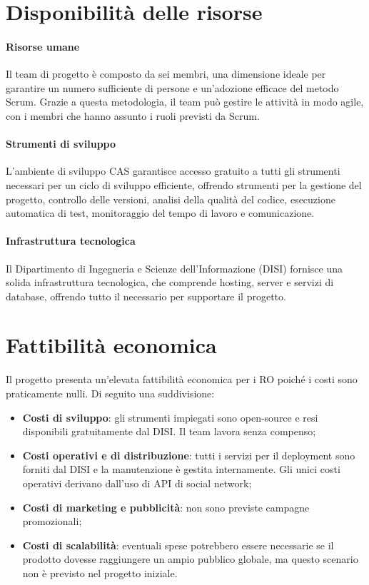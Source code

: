 \documentclass[12pt,a4paper]{report}
\begin{document}
\section{Disponibilità delle risorse}

\paragraph{Risorse umane}
Il team di progetto è composto da sei membri, una dimensione ideale per garantire un numero sufficiente di persone e un'adozione efficace del metodo Scrum. Grazie a questa metodologia, il team può gestire le attività in modo agile, con i membri che hanno assunto i ruoli previsti da Scrum.

\paragraph{Strumenti di sviluppo}
L'ambiente di sviluppo CAS garantisce accesso gratuito a tutti gli strumenti necessari per un ciclo di sviluppo efficiente, offrendo strumenti per la gestione del progetto, controllo delle versioni, analisi della qualità del codice, esecuzione automatica di test, monitoraggio del tempo di lavoro e comunicazione.

\paragraph{Infrastruttura tecnologica}
Il Dipartimento di Ingegneria e Scienze dell'Informazione (DISI) fornisce una solida infrastruttura tecnologica, che comprende hosting, server e servizi di database, offrendo tutto il necessario per supportare il progetto.

\section{Fattibilità economica}
Il progetto presenta un'elevata fattibilità economica per i RO poiché i costi sono praticamente nulli. Di seguito una suddivisione:
\begin{itemize}
    \item \textbf{Costi di sviluppo}: gli strumenti impiegati sono open-source e resi disponibili gratuitamente dal DISI. Il team lavora senza compenso;
    \item \textbf{Costi operativi e di distribuzione}: tutti i servizi per il deployment sono forniti dal DISI e la manutenzione è gestita internamente. Gli unici costi operativi derivano dall'uso di API di social network;
    \item \textbf{Costi di marketing e pubblicità}: non sono previste campagne promozionali;
    \item \textbf{Costi di scalabilità}: eventuali spese potrebbero essere necessarie se il prodotto dovesse raggiungere un ampio pubblico globale, ma questo scenario non è previsto nel progetto iniziale.
\end{itemize}
\end{document}
